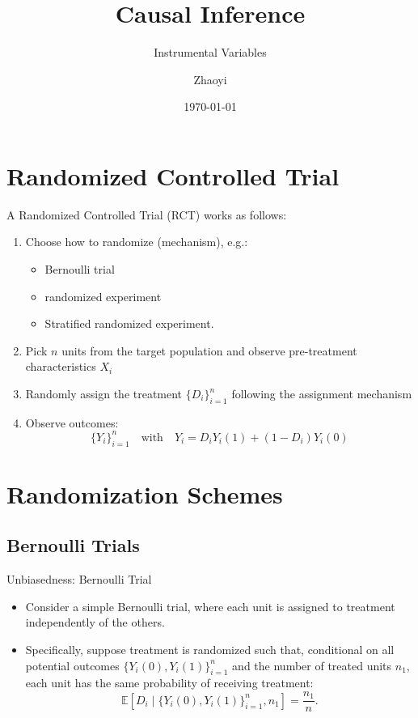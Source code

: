 \documentclass[11pt,aspectratio=169]{beamer}
\title[Causal Inference]{Causal Inference}
\subtitle{Instrumental Variables}
\author[Zhaoyi]{Zhaoyi}
\date{\today}
\begin{document}
\begin{titleframe}


\end{titleframe}


\begin{outlineframe}

\end{outlineframe}










\section{Randomized Controlled Trial}
\begin{frame}
A Randomized Controlled Trial (RCT) works as follows:
\begin{enumerate}
    \item Choose how to randomize (mechanism), e.g.:
        \begin{itemize}
            \item Bernoulli trial
            \item randomized experiment
            \item Stratified randomized experiment.
        \end{itemize}
    \item Pick $n$ units from the target population and observe pre-treatment characteristics $X_i$
    \item Randomly assign the treatment $\{D_i\}_{i=1}^n$ following the assignment mechanism
    \item Observe outcomes:$$\{Y_i\}_{i=1}^n \quad \text{with}\quad Y_i=D_iY_i(1)+(1-D_i)Y_i(0)$$
\end{enumerate}


\end{frame}



\section{Randomization Schemes}
\subsection{Bernoulli Trials}

\begin{frame}{Unbiasedness: Bernoulli Trial}
\begin{itemize}
    \item Consider a simple Bernoulli trial, where each unit is assigned to treatment independently of the others.
    \item Specifically, suppose treatment is randomized such that, conditional on all potential outcomes $\{Y_i(0), Y_i(1)\}_{i=1}^n$ and the number of treated units $n_1$, each unit has the same probability of receiving treatment:
    $$\mathbb{E}[D_i \mid \{Y_i(0), Y_i(1)\}_{i=1}^n, n_1] = \frac{n_1}{n}.$$
\end{itemize}

\end{frame}
\end{document}
